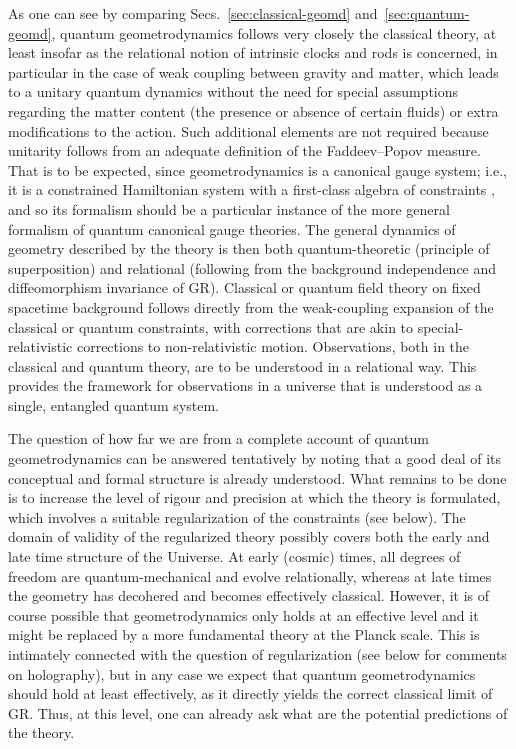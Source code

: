 \documentclass[12pt]{iopart}
\begin{document}
As one can see by comparing Secs.~\ref{sec:classical-geomd} and~\ref{sec:quantum-geomd}, quantum geometrodynamics follows very closely the classical theory, at least insofar as the relational notion of intrinsic clocks and rods is concerned, in particular in the case of weak coupling between gravity and matter, which leads to a unitary quantum dynamics without the need for special assumptions regarding the matter content (the presence or absence of certain fluids) or extra modifications to the action. Such additional elements are not required because unitarity follows from an adequate definition of the Faddeev--Popov measure. That is to be expected, since geometrodynamics is a canonical gauge system; i.e., it is a constrained Hamiltonian system with a first-class algebra of constraints \citep{HT:book}, and so its formalism should be a particular instance of the more general formalism of quantum canonical gauge theories. The general dynamics of geometry described by the theory is then both quantum-theoretic (principle of superposition) and relational (following from the background independence and diffeomorphism invariance of GR). Classical or quantum field theory on fixed spacetime background follows directly from the weak-coupling expansion of the classical or quantum constraints, with corrections that are akin to special-relativistic corrections to non-relativistic motion. Observations, both in the classical and quantum theory, are to be understood in a relational way. This provides the framework for observations in a universe that is understood as a single, entangled quantum system.

The question of how far we are from a complete account of quantum geometrodynamics can be answered tentatively by noting that a good deal of its conceptual and formal structure is already understood. What remains to be done is to increase the level of rigour and precision at which the theory is formulated, which involves a suitable regularization of the constraints (see below). The domain of validity of the regularized theory possibly covers both the early and late time structure of the Universe. At early (cosmic) times, all degrees of freedom are quantum-mechanical and evolve relationally, whereas at late times the geometry has decohered and becomes effectively classical. However, it is of course possible that geometrodynamics only holds at an effective level and it might be replaced by a more fundamental theory at the Planck scale. This is intimately connected with the question of regularization (see below for comments on holography), but in any case we expect that quantum geometrodynamics should hold at least effectively, as it directly yields the correct classical limit of GR. Thus, at this level, one can already ask what are the potential predictions of the theory.
\end{document}
